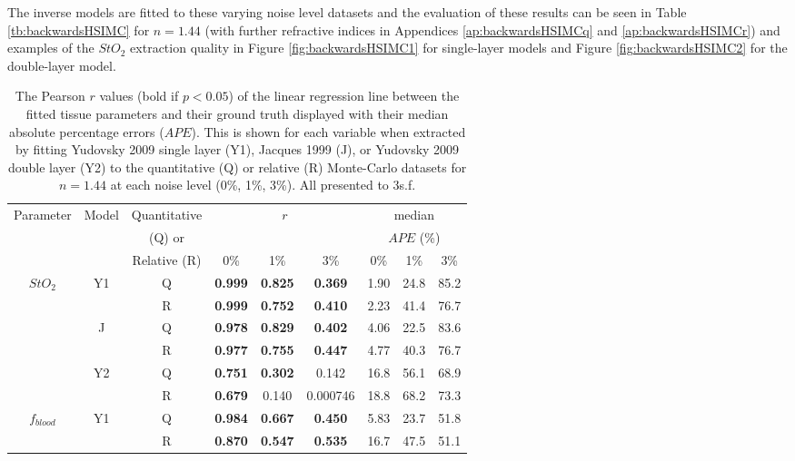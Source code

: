 The inverse models are fitted to these varying noise level datasets and the evaluation of these results can be seen in Table \ref{tb:backwardsHSIMC} for $n=1.44$ (with further refractive indices in Appendices \ref{ap:backwardsHSIMCq} and \ref{ap:backwardsHSIMCr}) and examples of the $StO_2$ extraction quality in Figure \ref{fig:backwardsHSIMC1} for single-layer models and Figure \ref{fig:backwardsHSIMC2} for the double-layer model. 

\begin{table}[h!]
    \centering
    \caption{The Pearson $r$ values (bold if $p<0.05$) of the linear regression line between the fitted tissue parameters and their ground truth displayed with their median absolute percentage errors ($APE$). This is shown for each variable when extracted by fitting Yudovsky 2009 single layer (Y1), Jacques 1999 (J), or Yudovsky 2009 double layer (Y2) to the quantitative (Q) or relative (R) Monte-Carlo datasets for $n=1.44$ at each noise level (0\%, 1\%, 3\%). All presented to 3s.f.}
    \begin{tabular}{|ccc|ccc|ccc|}
        \hline
        Parameter & Model & Quantitative & \multicolumn{3}{c}{$r$} & \multicolumn{3}{|c|}{median} \\
        & & (Q) or & \multicolumn{3}{c}{} & \multicolumn{3}{|c|}{$APE$ (\%)} \\
        & & Relative (R) & 0\% & 1\% & 3\% & 0\% & 1\% & 3\% \\
        \hline
        \multirow{6}{*}{$StO_2$} & \multirow{2}{*}{Y1} & Q & \textbf{0.999} & \textbf{0.825} & \textbf{0.369} & 1.90 & 24.8 & 85.2 \\
        & & R & \textbf{0.999} & \textbf{0.752} & \textbf{0.410} & 2.23 & 41.4 & 76.7 \\
        \cline{2-9}
        & \multirow{2}{*}{J} & Q & \textbf{0.978} & \textbf{0.829} & \textbf{0.402} & 4.06 & 22.5 & 83.6 \\
        & & R & \textbf{0.977} & \textbf{0.755} & \textbf{0.447} & 4.77 & 40.3 & 76.7 \\
        \cline{2-9}
        & \multirow{2}{*}{Y2} & Q & \textbf{0.751} & \textbf{0.302} & 0.142 & 16.8 & 56.1 & 68.9 \\
        & & R & \textbf{0.679} & 0.140 & 0.000746 & 18.8 & 68.2 & 73.3 \\
        \hline
        \multirow{6}{*}{$f_{blood}$} & \multirow{2}{*}{Y1} & Q & \textbf{0.984} & \textbf{0.667} & \textbf{0.450} & 5.83 & 23.7 & 51.8\\
        & & R & \textbf{0.870} & \textbf{0.547} & \textbf{0.535} & 16.7 & 47.5 & 51.1\\

\end{tabular}
\end{table}
